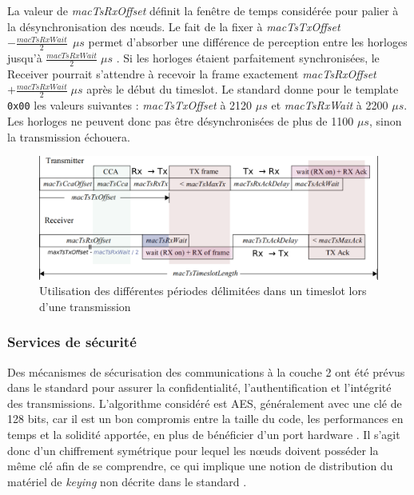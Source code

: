 \documentclass[]{report}
\begin{document}
\vspace{0.4cm}	
	
\par La valeur de \textit{macTsRxOffset} définit la fenêtre de temps considérée pour palier à la désynchronisation des nœuds. Le fait de la fixer à \textit{macTsTxOffset} $- \frac{macTsRxWait}{2} \: \: \mu s$ permet d'absorber une différence de perception entre les horloges jusqu'à $\frac{macTsRxWait}{2} \;\mu s$ \cite{ATP}. Si les horloges étaient parfaitement synchronisées, le Receiver pourrait s'attendre à recevoir la frame exactement \textit{macTsRxOffset} $+ \frac{macTsRxWait}{2} \; \mu s$ après le début du timeslot. Le standard \cite{IEEE802.15.4} donne pour le template \texttt{0x00} les valeurs suivantes : \textit{macTsTxOffset} à 2120 $\mu s$ et \textit{macTsRxWait} à 2200 $\mu s$. Les horloges ne peuvent donc pas être désynchronisées de plus de 1100 $\mu s$, sinon la transmission échouera.

\vspace{0.4cm}

	\begin{figure}[!ht]
	\centering
	\includegraphics[width=\linewidth]{timeslot}
	\caption{Utilisation des différentes périodes délimitées dans un timeslot lors d'une transmission}
	\label{fig:timeslot}
	\end{figure}

\subsubsection{Services de sécurité}

Des mécanismes de sécurisation des communications à la couche 2 ont été prévus dans le standard pour assurer la confidentialité, l'authentification et l'intégrité des transmissions. L'algorithme considéré est AES, généralement avec une clé de 128 bits, car il est un bon compromis entre la taille du code, les performances en temps et la solidité apportée, en plus de bénéficier d'un port hardware \cite{link-layer-sec-impact}. Il s'agit donc d'un chiffrement symétrique pour lequel les nœuds doivent posséder la même clé afin de se comprendre, ce qui implique une notion de distribution du matériel de \textit{keying} non décrite dans le standard \cite{IEEE802.15.4}.\\
\end{document}
